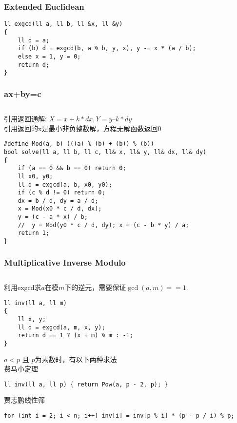 \documentclass[twoside]{article}
\begin{document}
\subsubsection{Extended Euclidean}
\begin{lstlisting}
ll exgcd(ll a, ll b, ll &x, ll &y)
{
    ll d = a;
    if (b) d = exgcd(b, a % b, y, x), y -= x * (a / b);
    else x = 1, y = 0;
    return d;
}
\end{lstlisting}
\subsubsection{ax+by=c}
\begin{lstlisting}
\end{lstlisting}
引用返回通解: $X = x + k * dx, Y = y – k * dy$\\
引用返回的x是最小非负整数解，方程无解函数返回0
\begin{lstlisting}
#define Mod(a, b) (((a) % (b) + (b)) % (b))
bool solve(ll a, ll b, ll c, ll& x, ll& y, ll& dx, ll& dy)
{
    if (a == 0 && b == 0) return 0;
    ll x0, y0;
    ll d = exgcd(a, b, x0, y0);
    if (c % d != 0) return 0;
    dx = b / d, dy = a / d;
    x = Mod(x0 * c / d, dx);
    y = (c - a * x) / b;
    //  y = Mod(y0 * c / d, dy); x = (c - b * y) / a;
    return 1;
}
\end{lstlisting}
\subsubsection{Multiplicative Inverse Modulo}
\begin{lstlisting}
\end{lstlisting}
利用exgcd求$a$在模$m$下的逆元，需要保证$\gcd(a, m) == 1$.
\begin{lstlisting}
ll inv(ll a, ll m)
{
    ll x, y;
    ll d = exgcd(a, m, x, y);
    return d == 1 ? (x + m) % m : -1;
}
\end{lstlisting}
$a < p$ 且 $p$为素数时，有以下两种求法\\
费马小定理
\begin{lstlisting}
ll inv(ll a, ll p) { return Pow(a, p - 2, p); }
\end{lstlisting}
贾志鹏线性筛
\begin{lstlisting}
for (int i = 2; i < n; i++) inv[i] = inv[p % i] * (p - p / i) % p;
\end{lstlisting}
\end{document}
